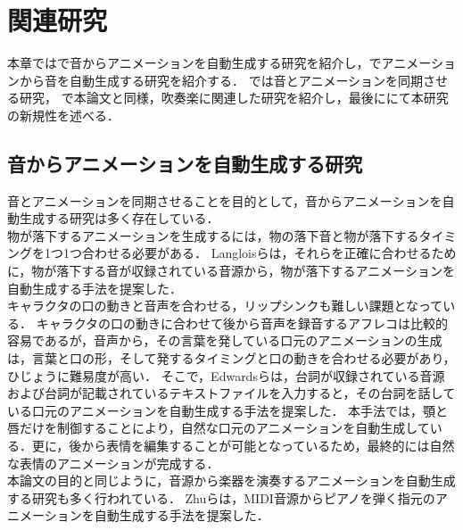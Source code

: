 \chapter{関連研究}
\label{chap:previousworks}
本章ではで音からアニメーションを自動生成する研究を紹介し，でアニメーションから音を自動生成する研究を紹介する．
では音とアニメーションを同期させる研究，
で本論文と同様，吹奏楽に関連した研究を紹介し，最後ににて本研究の新規性を述べる．

\section{音からアニメーションを自動生成する研究}\label{sec:generate_animation}
音とアニメーションを同期させることを目的として，音からアニメーションを自動生成する研究は多く存在している．\\
\indent
物が落下するアニメーションを生成するには，物の落下音と物が落下するタイミングを1つ1つ合わせる必要がある．
Langloisら\cite{IFA}は，それらを正確に合わせるために，物が落下する音が収録されている音源から，物が落下するアニメーションを自動生成する手法を提案した．\\
%
\indent
キャラクタの口の動きと音声を合わせる，リップシンクも難しい課題となっている．
キャラクタの口の動きに合わせて後から音声を録音するアフレコは比較的容易であるが，音声から，その言葉を発している口元のアニメーションの生成は，言葉と口の形，そして発するタイミングと口の動きを合わせる必要があり，ひじょうに難易度が高い．
そこで，Edwardsら\cite{JALI}は，台詞が収録されている音源および台詞が記載されているテキストファイルを入力すると，その台詞を話している口元のアニメーションを自動生成する手法を提案した．
本手法では，顎と唇だけを制御することにより，自然な口元のアニメーションを自動生成している．更に，後から表情を編集することが可能となっているため，最終的には自然な表情のアニメーションが完成する．\\
%
\indent
本論文の目的と同じように，音源から楽器を演奏するアニメーションを自動生成する研究も多く行われている．
Zhuら\cite{piano}は，MIDI音源からピアノを弾く指元のアニメーションを自動生成する手法を提案した．
